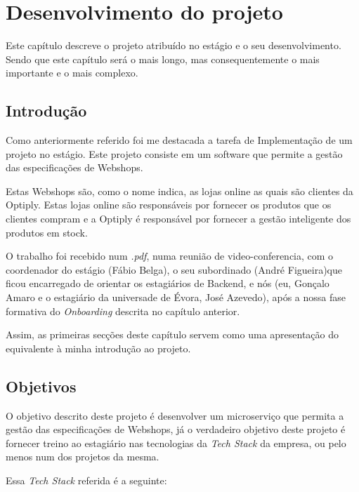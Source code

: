 \chapter{Desenvolvimento do projeto}\label{cap4}

Este capítulo descreve o projeto atribuído no estágio e o seu desenvolvimento. Sendo que este capítulo será o mais longo, mas consequentemente o mais importante e o mais complexo.

\section{Introdução}

Como anteriormente referido foi me destacada a tarefa de Implementação de um projeto no estágio. Este projeto consiste em um software que permite a gestão das especificações de Webshops.

Estas Webshops são, como o nome indica, as lojas online as quais são clientes da Optiply. Estas lojas online são responsáveis por fornecer os produtos que os clientes compram e a Optiply é responsável por fornecer a gestão inteligente dos produtos em stock.

O trabalho foi recebido num \textit{.pdf}, numa reunião de video-conferencia, com o coordenador do estágio (Fábio Belga), o seu subordinado (André Figueira)que ficou encarregado de orientar os estagiários de Backend, e nós (eu, Gonçalo Amaro e o estagiário da universade de Évora, José Azevedo), após a nossa fase formativa do \textit{Onboarding} descrita no capítulo anterior.

Assim, as primeiras secções deste capítulo servem como uma apresentação do equivalente à minha introdução ao projeto.

\section{Objetivos}

O objetivo descrito deste projeto é desenvolver um microserviço que permita a gestão das especificações de Webshops, já o verdadeiro objetivo deste projeto é fornecer treino ao estagiário nas tecnologias da \textit{Tech Stack} da empresa, ou pelo menos num dos projetos da mesma.

\newpage

Essa \textit{Tech Stack} referida é a seguinte:

